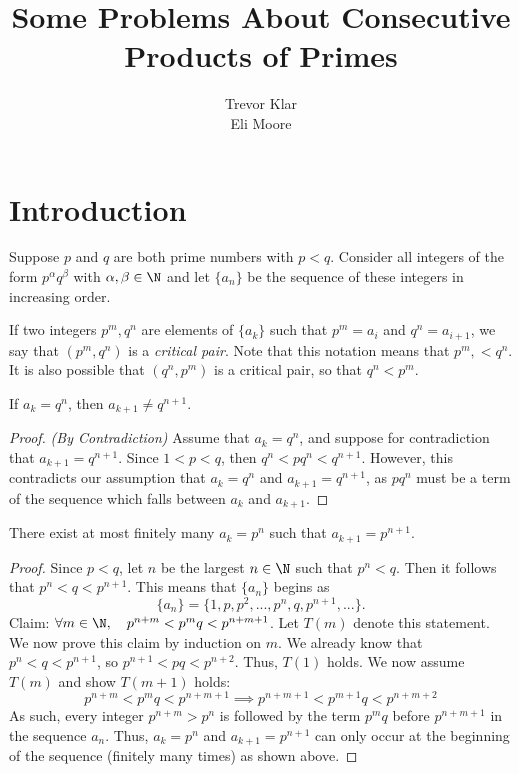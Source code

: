 \documentclass[a5paper]{article}
\title{Some Problems About Consecutive Products of Primes}
\author{Trevor Klar \\ Eli Moore}
\begin{document}
\maketitle
\section{Introduction}
Suppose $p$ and $q$ are both prime numbers with $p < q$. Consider all integers of the form $p^\alpha q^\beta$ with $\alpha, \beta \in \N$ and let $\{a_n\}$ be the sequence of these integers in increasing order.
 
\begin{definition*}
If two integers $p^m, q^n$ are elements of $\{a_k\}$ such that $p^m=a_i$ and $q^n=a_{i+1}$, we say that $(p^m, q^n)$ is a \emph{critical pair}. Note that this notation means that $p^m,<q^n$. It is also possible that $(q^n, p^m)$ is a critical pair, so that $q^n < p^m$.
\end{definition*}
 
\begin{lemma}
    If $a_k = q^n$, then $a_{k+1} \neq q^{n+1}$.
\begin{proof} \textit{(By Contradiction)} 
    Assume that $a_k = q^n$, and suppose for contradiction that $a_{k+1} = q^{n+1}$. Since $1 < p < q$, then $q^n < pq^n < q^{n+1}$. However, this contradicts our assumption that $a_k = q^n$ and $a_{k+1} = q^{n+1}$, as $pq^n$ must be a term of the sequence which falls between $a_k$ and $a_{k+1}$.
\end{proof}
\end{lemma}

\begin{lemma}\label{finite_repetition_lemma}
    There exist at most finitely many $a_k = p^n$ such that $a_{k+1} = p^{n+1}$.
\begin{proof} 
    Since $p<q$, let $n$ be the largest $n \in \N$ such that $p^n < q$. Then it follows that $p^n < q < p^{n+1}$. This means that $\{a_n\}$ begins as $$\{a_n\} = \{1,p, p^2, ..., p^n, q, p^{n+1},...\}.$$
    Claim: $\forall m \in \N, \quad p^{n+m} < p^mq < p^{n+m+1}$. Let $T(m)$ denote this statement. We now prove this claim by induction on $m$. We already know that $p^n < q < p^{n+1}$, so $p^{n+1} < pq < p^{n+2}$. Thus, $T(1)$ holds. We now assume $T(m)$ and show $T(m+1)$ holds:
    $$p^{n+m} < p^mq < p^{n+m+1} \implies p^{n+m+1} < p^{m+1}q < p^{n+m+2}$$
    As such, every integer $p^{n+m} > p^n$ is followed by the term $p^mq$ before $p^{n+m+1}$ in the sequence $a_n$. Thus, $a_k = p^n$ and $a_{k+1} = p^{n+1}$ can only occur at the beginning of the sequence (finitely many times) as shown above.
\end{proof}
\end{lemma}
\end{document}
